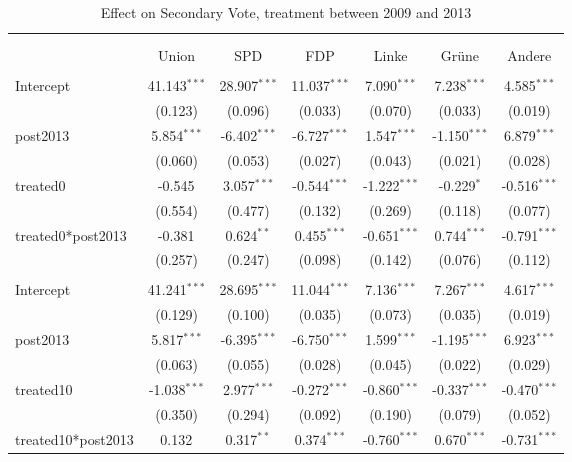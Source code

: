 \documentclass[12pt]{article}
\begin{document}
 
\begin{table}[!htbp] \centering
  \caption{Effect on Secondary Vote, treatment between 2009 and 2013}
\begin{tabular}{@{\extracolsep{5pt}}lcccccc}
\\[-1.8ex]\hline
\hline \\[-1.8ex]
\\[-1.8ex] & \multicolumn{1}{c}{Union} & \multicolumn{1}{c}{SPD} & \multicolumn{1}{c}{FDP} & \multicolumn{1}{c}{Linke} & \multicolumn{1}{c}{Grüne} & \multicolumn{1}{c}{Andere}  \\
\hline \\[-1.8ex]
 Intercept & 41.143$^{***}$ & 28.907$^{***}$ & 11.037$^{***}$ & 7.090$^{***}$ & 7.238$^{***}$ & 4.585$^{***}$ \\
  & (0.123) & (0.096) & (0.033) & (0.070) & (0.033) & (0.019) \\
 post2013 & 5.854$^{***}$ & -6.402$^{***}$ & -6.727$^{***}$ & 1.547$^{***}$ & -1.150$^{***}$ & 6.879$^{***}$ \\
  & (0.060) & (0.053) & (0.027) & (0.043) & (0.021) & (0.028) \\
 treated0 & -0.545$^{}$ & 3.057$^{***}$ & -0.544$^{***}$ & -1.222$^{***}$ & -0.229$^{*}$ & -0.516$^{***}$ \\
  & (0.554) & (0.477) & (0.132) & (0.269) & (0.118) & (0.077) \\
 treated0*post2013 & -0.381$^{}$ & 0.624$^{**}$ & 0.455$^{***}$ & -0.651$^{***}$ & 0.744$^{***}$ & -0.791$^{***}$ \\
  & (0.257) & (0.247) & (0.098) & (0.142) & (0.076) & (0.112) \\
\hline \\[-1.8ex]
 Intercept & 41.241$^{***}$ & 28.695$^{***}$ & 11.044$^{***}$ & 7.136$^{***}$ & 7.267$^{***}$ & 4.617$^{***}$ \\
  & (0.129) & (0.100) & (0.035) & (0.073) & (0.035) & (0.019) \\
 post2013 & 5.817$^{***}$ & -6.395$^{***}$ & -6.750$^{***}$ & 1.599$^{***}$ & -1.195$^{***}$ & 6.923$^{***}$ \\
  & (0.063) & (0.055) & (0.028) & (0.045) & (0.022) & (0.029) \\
 treated10 & -1.038$^{***}$ & 2.977$^{***}$ & -0.272$^{***}$ & -0.860$^{***}$ & -0.337$^{***}$ & -0.470$^{***}$ \\
  & (0.350) & (0.294) & (0.092) & (0.190) & (0.079) & (0.052) \\
 treated10*post2013 & 0.132$^{}$ & 0.317$^{**}$ & 0.374$^{***}$ & -0.760$^{***}$ & 0.670$^{***}$ & -0.731$^{***}$ \\

\end{tabular}
\end{table}
\end{document}

